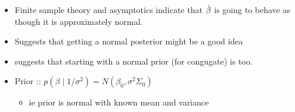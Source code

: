 \begin{itemize}[leftmargin=0pt]
\item Finite sample theory and asymptotics indicate that
  $\hat{\beta}$ is going to behave as though it is approximately normal.
\item Suggests that getting a normal posterior might be a good idea
\item suggests that starting with a normal prior (for congugate) is too.
\item Prior :: $p(\beta \mid 1/\sigma^2) = N(\beta_0, \sigma^2 \Sigma_0)$
\begin{itemize}
\item ie prior is normal with known mean and variance
\end{itemize}
\end{itemize}

